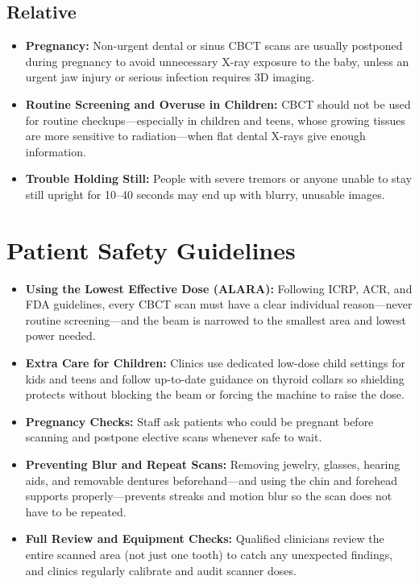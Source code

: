 \subsection{Relative}
\begin{itemize}
    \item \textbf{Pregnancy:} Non-urgent dental or sinus CBCT scans are usually postponed during pregnancy to avoid unnecessary X-ray exposure to the baby, unless an urgent jaw injury or serious infection requires 3D imaging.
    \item \textbf{Routine Screening and Overuse in Children:} CBCT should not be used for routine checkups---especially in children and teens, whose growing tissues are more sensitive to radiation---when flat dental X-rays give enough information.
    \item \textbf{Trouble Holding Still:} People with severe tremors or anyone unable to stay still upright for 10--40 seconds may end up with blurry, unusable images.
\end{itemize}

\section{Patient Safety Guidelines}
\begin{itemize}
    \item \textbf{Using the Lowest Effective Dose (ALARA):} Following ICRP, ACR, and FDA guidelines, every CBCT scan must have a clear individual reason---never routine screening---and the beam is narrowed to the smallest area and lowest power needed.
    \item \textbf{Extra Care for Children:} Clinics use dedicated low-dose child settings for kids and teens and follow up-to-date guidance on thyroid collars so shielding protects without blocking the beam or forcing the machine to raise the dose.
    \item \textbf{Pregnancy Checks:} Staff ask patients who could be pregnant before scanning and postpone elective scans whenever safe to wait.
    \item \textbf{Preventing Blur and Repeat Scans:} Removing jewelry, glasses, hearing aids, and removable dentures beforehand---and using the chin and forehead supports properly---prevents streaks and motion blur so the scan does not have to be repeated.
    \item \textbf{Full Review and Equipment Checks:} Qualified clinicians review the entire scanned area (not just one tooth) to catch any unexpected findings, and clinics regularly calibrate and audit scanner doses.
\end{itemize}

